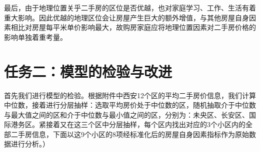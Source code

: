 \documentclass[withoutpreface,bwprint]{cumcmthesis} %
\begin{document}
最后，由于地理位置关乎二手房的区位是否优越，也对家庭学习、工作、生活有着重大影响。因此优越的地理区位会让房屋产生巨大的额外增值，与其他房屋自身因素相比对房屋每平米单价影响最大，故购房家庭应将地理位置因素对二手房价格的影响单独着重考量。

\section{任务二：模型的检验与改进}
首先我们进行模型的检验。根据附件中西安12个区的平均二手房价信息，我们计算中位数，接着进行分层抽样：选取平均房价处于中位数的区，随机抽取介于中位数与最大值之间的区和介于中位数与最小值之间的区，分别为：未央区、长安区、国际港务区。紧接着又在这三个区中分层抽样，每个区内找出对应的3个小区内的全部二手房信息，下面以这9个小区的8项经标准化后的房屋自身因素指标作为原始数据进行分析。）
\end{document}
